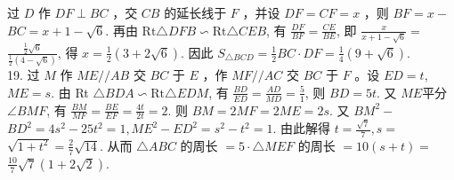 \documentclass[10pt]{article}
\begin{document}
过 $D$ 作 $D F \perp B C$ ，交 $C B$ 的延长线于 $F$ ，并设 $D F=C F=x$ ，则 $B F=x-$ $B C=x+1-\sqrt{6}$. 再由 $\mathrm{Rt} \triangle D F B \backsim \mathrm{Rt} \triangle C E B$, 有 $\frac{D F}{B F}=\frac{C E}{B E}$, 即 $\frac{x}{x+1-\sqrt{6}}=$ $\frac{\frac{1}{2} \sqrt{6}}{\frac{1}{2}(4-\sqrt{6})}$, 得 $x=\frac{1}{2}(3+2 \sqrt{6})$. 因此 $S_{\triangle B C D}=\frac{1}{2} B C \cdot D F=\frac{1}{4}(9+\sqrt{6})$.\\
19. 过 $M$ 作 $M E / / A B$ 交 $B C$ 于 $E$ ，作 $M F / / A C$ 交 $B C$ 于 $F$ 。设 $E D=t$, $M E=s$. 由 Rt $\triangle B D A \backsim \mathrm{Rt} \triangle E D M$, 有 $\frac{B D}{E D}=\frac{A D}{M D}=\frac{5}{1}$, 则 $B D=5 t$. 又 $M E$平分 $\angle B M F$, 有 $\frac{B M}{M F}=\frac{B E}{E F}=\frac{4 t}{2 t}=2$. 则 $B M=2 M F=2 M E=2 s$. 又 $B M^{2}-$ $B D^{2}=4 s^{2}-25 t^{2}=1, M E^{2}-E D^{2}=s^{2}-t^{2}=1$. 由此解得 $t=\frac{\sqrt{7}}{7}, s=$ $\sqrt{1+t^{2}}=\frac{2}{7} \sqrt{14}$. 从而 $\triangle A B C$ 的周长 $=5 \cdot \triangle M E F$ 的周长 $=10(s+t)=$ $\frac{10}{7} \sqrt{7}(1+2 \sqrt{2})$.
\end{document}
